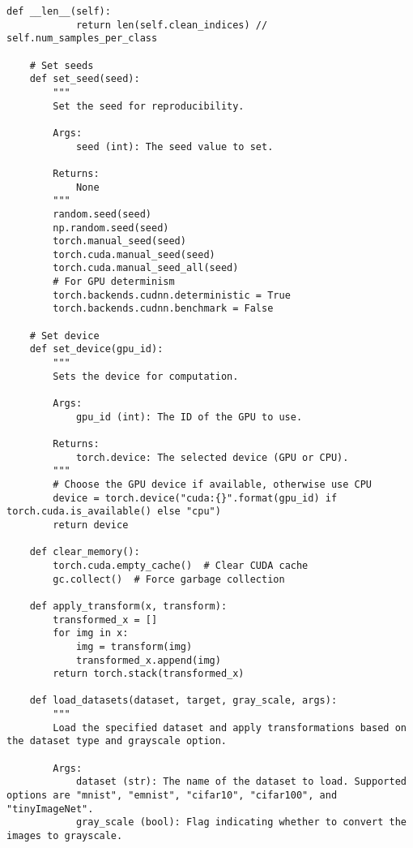 \begin{lstlisting}[style=pythonstyle, caption={メインコード}]
        def __len__(self):
            return len(self.clean_indices) // self.num_samples_per_class
    
    # Set seeds
    def set_seed(seed):
        """
        Set the seed for reproducibility.
    
        Args:
            seed (int): The seed value to set.
    
        Returns:
            None
        """
        random.seed(seed)
        np.random.seed(seed)
        torch.manual_seed(seed)
        torch.cuda.manual_seed(seed)
        torch.cuda.manual_seed_all(seed)
        # For GPU determinism
        torch.backends.cudnn.deterministic = True
        torch.backends.cudnn.benchmark = False
    
    # Set device
    def set_device(gpu_id):
        """
        Sets the device for computation.
    
        Args:
            gpu_id (int): The ID of the GPU to use.
    
        Returns:
            torch.device: The selected device (GPU or CPU).
        """
        # Choose the GPU device if available, otherwise use CPU
        device = torch.device("cuda:{}".format(gpu_id) if torch.cuda.is_available() else "cpu")
        return device
    
    def clear_memory():
        torch.cuda.empty_cache()  # Clear CUDA cache
        gc.collect()  # Force garbage collection
    
    def apply_transform(x, transform):
        transformed_x = []
        for img in x:
            img = transform(img)
            transformed_x.append(img)
        return torch.stack(transformed_x)
    
    def load_datasets(dataset, target, gray_scale, args):
        """
        Load the specified dataset and apply transformations based on the dataset type and grayscale option.
        
        Args:
            dataset (str): The name of the dataset to load. Supported options are "mnist", "emnist", "cifar10", "cifar100", and "tinyImageNet".
            gray_scale (bool): Flag indicating whether to convert the images to grayscale.
            

\end{lstlisting}
